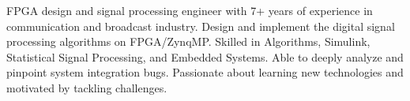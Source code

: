 \par{
    FPGA design and signal processing engineer with 7+ years of experience in 
    communication and broadcast industry. Design and implement the 
    digital signal processing algorithms on FPGA/ZynqMP.
    Skilled in Algorithms, Simulink, Statistical Signal Processing, and Embedded Systems.
	Able to deeply analyze and pinpoint system integration bugs. Passionate about learning
	new technologies and motivated by tackling challenges.
    \\
}